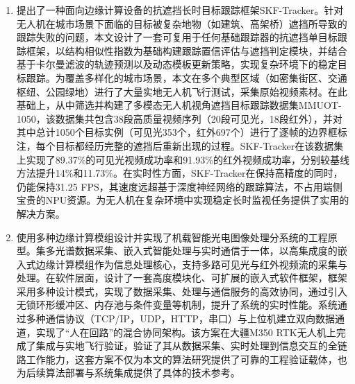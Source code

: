 \begin{chineseabstract}
\begin{enumerate}[wide,]
    \item 提出了一种面向边缘计算设备的抗遮挡长时目标跟踪框架SKF-Tracker。针对无人机在城市场景下面临的目标被复杂地物（如建筑、高架桥）遮挡所导致的跟踪失败的问题，本文设计了一套可复用于任何基础跟踪器的抗遮挡单目标跟踪框架，以结构相似性指数为基础构建跟踪置信评估与遮挡判定模块，并结合基于卡尔曼滤波的轨迹预测以及动态模板更新策略，实现复杂环境下的稳定目标跟踪。为覆盖多样化的城市场景，本文在多个典型区域（如密集街区、交通枢纽、公园绿地）进行了大量实地无人机飞行测试，采集原始视频素材。在此基础上，从中筛选并构建了多模态无人机视角遮挡目标跟踪数据集MMUOT-1050，该数据集共包含38段高质量视频序列（20段可见光，18段红外），并对其中总计1050个目标实例（可见光353个，红外697个）进行了逐帧的边界框标注，每个目标都经历完整的遮挡后重新出现的过程。SKF-Tracker在该数据集上实现了89.37\%的可见光视频成功率和91.93\%的红外视频成功率，分别较基线方法提升14\%和11.73\%。在实时性方面，SKF-Tracker在保持高精度的同时，仍能保持31.25 FPS，其速度远超基于深度神经网络的跟踪算法，不占用端侧宝贵的NPU资源。为无人机在复杂环境中实现稳定长时监视任务提供了实用的解决方案。
    
    \item 使用多种边缘计算模组设计并实现了机载智能光电图像处理分系统的工程原型。集多光谱数据采集、嵌入式智能处理与实时通信于一体，以高集成度的嵌入式边缘计算模组作为信息处理核心，支持多路可见光与红外视频流的采集与处理。在软件层面，设计了一套高度模块化、可扩展的嵌入式软件框架，框架采用多种设计模式，实现了数据采集、处理与通信服务的高效协同，通过引入无锁环形缓冲区、内存池与条件变量等机制，提升了系统的实时性能。系统通过多种通信协议（TCP/IP，UDP，HTTP，串口）与上位机建立双向数据通道，实现了“人在回路”的混合协同架构。该方案在大疆M350 RTK无人机上完成了集成与实地飞行验证，验证了其从数据采集、实时处理到信息交互的全链路工作能力，这套方案不仅为本文的算法研究提供了可靠的工程验证载体，也为后续算法部署与系统集成提供了具体的技术参考。    
\end{enumerate}


\end{chineseabstract}

